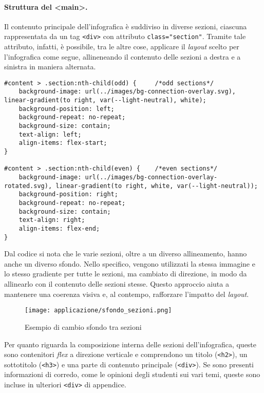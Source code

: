 \paragraph{Struttura del <main>.}\label{par:app_main} 
Il contenuto principale dell'infografica è suddiviso in diverse sezioni, ciascuna rappresentata da un tag \texttt{<div>} con attributo \texttt{class="section"}. Tramite tale attributo, infatti,
è possibile, tra le altre cose, applicare il \emph{layout} scelto per l'infografica come segue, allineneando il contenuto delle sezioni a destra e a sinistra in maniera alternata.
\begin{lstlisting}[style=htmlcssjs]
#content > .section:nth-child(odd) {     /*odd sections*/
    background-image: url(../images/bg-connection-overlay.svg), linear-gradient(to right, var(--light-neutral), white);
    background-position: left;
    background-repeat: no-repeat;
    background-size: contain;
    text-align: left;
    align-items: flex-start;
}

#content > .section:nth-child(even) {    /*even sections*/
    background-image: url(../images/bg-connection-overlay-rotated.svg), linear-gradient(to right, white, var(--light-neutral));
    background-position: right;
    background-repeat: no-repeat;
    background-size: contain;
    text-align: right;
    align-items: flex-end;
}
\end{lstlisting}
Dal codice si nota che le varie sezioni, oltre a un diverso allineamento, hanno anche un diverso sfondo. Nello specifico, vengono utilizzati la stessa immagine 
e lo stesso gradiente per tutte le sezioni, ma cambiato di direzione, in modo da allinearlo con il contenuto delle sezioni stesse. 
Questo approccio aiuta a mantenere una coerenza visiva e, al contempo, rafforzare l'impatto del \emph{layout}.
\begin{figure}[h]
    \centering
    \texttt{[image: applicazione/sfondo\_sezioni.png]}
    \caption{Esempio di cambio sfondo tra sezioni}
    \label{fig:app_sfondo_sezione}
\end{figure}

Per quanto riguarda la composizione interna delle sezioni dell'infografica, queste sono contenitori \emph{flex} a direzione verticale e comprendono un titolo (\texttt{<h2>}), un sottotitolo (\texttt{<h3>}) e una parte di 
contenuto principale (\texttt{<div>}). Se sono presenti informazioni di corredo, come le opinioni degli studenti sui vari temi, queste sono incluse in ulteriori \texttt{<div>} di appendice.

